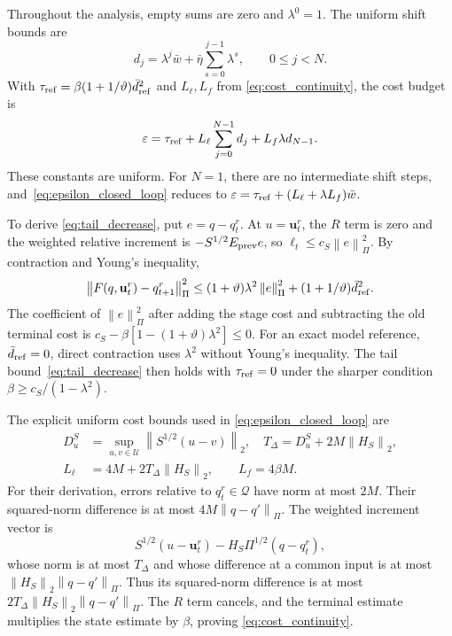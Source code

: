 \documentclass[journal]{IEEEtran}
\theoremstyle{plain}
\theoremstyle{definition}
\newcommand{\vu}{\mathbf{u}}
\newcommand{\norm}[1]{\left\lVert #1\right\rVert}
\begin{document}
Throughout the analysis, empty sums are zero and $\lambda^0=1$. The uniform shift bounds are
\begin{equation}
d_j=\lambda^j\bar w+\bar\eta\sum_{s=0}^{j-1}\lambda^s,\qquad 0\le j<N.
\label{eq:shift_error}
\end{equation}
With $\tau_{\rm ref}=\beta(1+1/\vartheta)\bar d_{\rm ref}^2$ and $L_\ell,L_f$ from \eqref{eq:cost_continuity}, the cost budget is
\begin{equation}
\varepsilon=\tau_{\rm ref}+L_\ell\sum_{j=0}^{N-1}d_j+L_f\lambda d_{N-1}.
\label{eq:epsilon_closed_loop}
\end{equation}
These constants are uniform. For $N=1$, there are no intermediate shift steps, and~\eqref{eq:epsilon_closed_loop} reduces to $\varepsilon=\tau_{\rm ref}+(L_\ell+\lambda L_f)\bar w$.

To derive \eqref{eq:tail_decrease}, put $e=q-q_t^r$. At $u=\vu_t^r$, the $R$ term is zero and the weighted relative increment is $-S^{1/2}E_{\rm prev}e$, so $\ell_t\le c_S\norm{e}_\Pi^2$. By contraction and Young's inequality,
\begin{equation*}
\norm{F(q,\vu_t^r)-q_{t+1}^r}_\Pi^2
\le(1+\vartheta)\lambda^2\norm{e}_\Pi^2
+(1+1/\vartheta)\bar d_{\rm ref}^2.
\end{equation*}
The coefficient of $\norm{e}_\Pi^2$ after adding the stage cost and subtracting the old terminal cost is $c_S-\beta[1-(1+\vartheta)\lambda^2]\le0$. For an exact model reference, $\bar d_{\rm ref}=0$, direct contraction uses $\lambda^2$ without Young's inequality. The tail bound~\eqref{eq:tail_decrease} then holds with $\tau_{\rm ref}=0$ under the sharper condition $\beta\ge c_S/(1-\lambda^2)$.

The explicit uniform cost bounds used in \eqref{eq:epsilon_closed_loop} are
\begin{equation}
\begin{split}
D_u^S&=\sup_{u,v\in\mathcal U}\norm{S^{1/2}(u-v)}_2,\quad
T_\Delta=D_u^S+2M\norm{H_S}_2,\\
L_\ell&=4M+2T_\Delta\norm{H_S}_2,\qquad L_f=4\beta M.
\end{split}
\label{eq:cost_continuity}
\end{equation}
For their derivation, errors relative to $q_t^r\in\mathcal Q$ have norm at most $2M$. Their squared-norm difference is at most $4M\norm{q-q'}_\Pi$. The weighted increment vector is
\begin{equation*}
S^{1/2}(u-\vu_t^r)-H_S\Pi^{1/2}(q-q_t^r),
\end{equation*}
whose norm is at most $T_\Delta$ and whose difference at a common input is at most $\norm{H_S}_2\norm{q-q'}_\Pi$. Thus its squared-norm difference is at most $2T_\Delta\norm{H_S}_2\norm{q-q'}_\Pi$. The $R$ term cancels, and the terminal estimate multiplies the state estimate by $\beta$, proving \eqref{eq:cost_continuity}.
\end{document}
